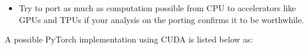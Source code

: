 {\begin{itemize}
    numerical framework you are using. For a first exposure to vectorized operations you can have a look at \cite{Hager2010}. For in depth understanding of 
    computer architecture that leads to the vectorized operations please refer to either \cite{Patterson2014} or \cite{Hennessy2019}.
    \item Try to port as much as computation possible from \ac{CPU} to accelerators like \ac{GPU}s and \ac{TPU}s if 
    your analysis on the porting confirms it to be worthwhile.
  \end{itemize}
  A possible PyTorch\cite{Paszke2019} implementation using \ac{CUDA}\cite{Nvidia} is listed below as:
  \label{code:irwf}    
\clearpage %
}
